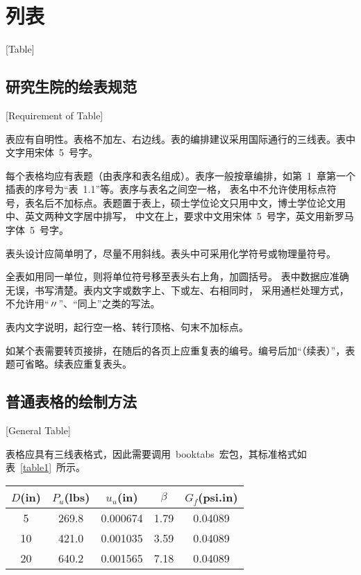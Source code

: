 
%
%
%

\chapter{列表}[Table]
\label{chap04}

\section{研究生院的绘表规范}[Requirement of Table]

表应有自明性。表格不加左、右边线。表的编排建议采用国际通行的三线表。表中文字用宋体~5~号字。

每个表格均应有表题（由表序和表名组成）。表序一般按章编排，如第~1~章第一个插表的序号为“表~1.1”等。表序与表名之间空一格，
表名中不允许使用标点符号，表名后不加标点。表题置于表上，硕士学位论文只用中文，博士学位论文用中、英文两种文字居中排写，
中文在上，要求中文用宋体~5~号字，英文用新罗马字体~5~号字。

表头设计应简单明了，尽量不用斜线。表头中可采用化学符号或物理量符号。

全表如用同一单位，则将单位符号移至表头右上角，加圆括号。
表中数据应准确无误，书写清楚。表内文字或数字上、下或左、右相同时，
采用通栏处理方式，不允许用“〃”、“同上”之类的写法。

表内文字说明，起行空一格、转行顶格、句末不加标点。

如某个表需要转页接排，在随后的各页上应重复表的编号。编号后加“（续表）”，表题可省略。续表应重复表头。

\section{普通表格的绘制方法}[General Table]

表格应具有三线表格式，因此需要调用~booktabs~宏包，其标准格式如表~\ref{table1}~所示。
\begin{table}[htbp]
\vspace{0.5em}\centering\wuhao
\begin{tabular}{ccccc}
\toprule[1.5pt]
$D$(in) & $P_u$(lbs) & $u_u$(in) & $\beta$ & $G_f$(psi.in)\\
\midrule[1pt]
 5 & 269.8 & 0.000674 & 1.79 & 0.04089\\
10 & 421.0 & 0.001035 & 3.59 & 0.04089\\
20 & 640.2 & 0.001565 & 7.18 & 0.04089\\
\bottomrule[1.5pt]
\end{tabular}
\end{table}

